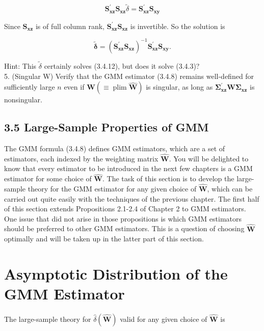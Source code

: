 \documentclass[10pt]{article}
\begin{document}
\begin{equation*}
\mathbf{S}_{\mathbf{x z}}^{\prime} \mathbf{S}_{\mathbf{x z}} \tilde{\delta}=\mathbf{S}_{\mathbf{x z}}^{\prime} \mathbf{S}_{\mathbf{x y}} \tag{3.4.12}
\end{equation*}


Since $\mathbf{S}_{\mathbf{x z}}$ is of full column rank, $\mathbf{S}_{\mathbf{x z}}^{\prime} \mathbf{S}_{\mathbf{x z}}$ is invertible. So the solution is

$$
\tilde{\boldsymbol{\delta}}=\left(\mathbf{S}_{\mathbf{x z}}^{\prime} \mathbf{S}_{\mathbf{x z}}\right)^{-1} \mathbf{S}_{\mathbf{x z}}^{\prime} \mathbf{S}_{\mathbf{x y}} .
$$

Hint: This $\tilde{\delta}$ certainly solves (3.4.12), but does it solve (3.4.3)?\\
5. (Singular W) Verify that the GMM estimator (3.4.8) remains well-defined for sufficiently large $n$ even if $\mathbf{W}(\equiv \operatorname{plim} \widehat{\mathbf{W}})$ is singular, as long as $\boldsymbol{\Sigma}_{\mathbf{x z}}^{\prime} \mathbf{W} \boldsymbol{\Sigma}_{\mathbf{x z}}$ is nonsingular.

\subsection*{3.5 Large-Sample Properties of GMM}
The GMM formula (3.4.8) defines GMM estimators, which are a set of estimators, each indexed by the weighting matrix $\widehat{\mathbf{W}}$. You will be delighted to know that every estimator to be introduced in the next few chapters is a GMM estimator for some choice of $\widehat{\mathbf{W}}$. The task of this section is to develop the large-sample theory for the GMM estimator for any given choice of $\widehat{\mathbf{W}}$, which can be carried out quite easily with the techniques of the previous chapter. The first half of this section extends Propositions 2.1-2.4 of Chapter 2 to GMM estimators. One issue that did not arise in those propositions is which GMM estimators should be preferred to other GMM estimators. This is a question of choosing $\widehat{\mathbf{W}}$ optimally and will be taken up in the latter part of this section.

\section*{Asymptotic Distribution of the GMM Estimator}
The large-sample theory for $\hat{\delta}(\widehat{\mathbf{W}})$ valid for any given choice of $\widehat{\mathbf{W}}$ is
\end{document}
